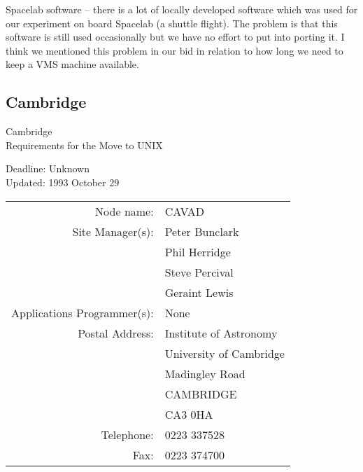 Spacelab software -- there is a lot of locally developed software which was 
used for our experiment on board Spacelab (a shuttle flight). 
The problem is that this software is still used occasionally but we have no
effort to put into porting it.
I think we mentioned this problem in our bid in relation to how long we need
to keep a VMS machine available.


\newpage
\subsection{Cambridge}

\renewcommand{\starsitename}{Cambridge}
\renewcommand{\starnodename}{CAVAD}

\renewcommand{\starunixdate}{Unknown}
\renewcommand{\starupdate}{1993 October 29}

\renewcommand{\starsitetelephone}{0223 337528}
\renewcommand{\starsitefax}{0223 374700}

\begin{center}
{\Large\sc \starsitename \\ [2ex]
           Requirements for the Move to UNIX}

\vspace{3mm}
{\large\sc Deadline: \starunixdate \\ [1ex]
           Updated: \starupdate}
\end{center}

\vspace{5mm}

\begin{center}
\begin{tabular}{rl}
{\sc Node name:}                  & \starnodename \\
{\sc Site Manager(s):}            & Peter Bunclark \\
                                  & Phil Herridge \\
                                  & Steve Percival \\
                                  & Geraint Lewis \\
{\sc Applications Programmer(s):} & None \\
{\sc Postal Address:}             & Institute of Astronomy \\
                                  & University of Cambridge \\
                                  & Madingley Road \\
                                  & CAMBRIDGE \\
                                  & CA3 0HA \\
{\sc Telephone:}                  & \starsitetelephone \\
{\sc Fax:}                        & \starsitefax \\
\end{tabular}
\end{center}


